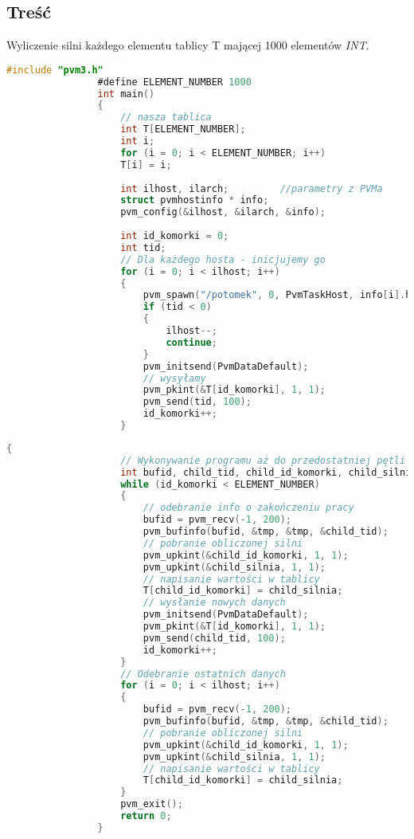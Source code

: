 			\subsection{Treść}
			Wyliczenie silni każdego elementu tablicy T mającej 1000 elementów \textit{INT}.
			\begin{lstlisting}[language=C]
				#include "pvm3.h"
				#define ELEMENT_NUMBER 1000
				int main()
				{
					// nasza tablica
					int T[ELEMENT_NUMBER];
					int i;
					for (i = 0; i < ELEMENT_NUMBER; i++)
					T[i] = i;
					
					int ilhost, ilarch;			//parametry z PVMa
					struct pvmhostinfo * info;
					pvm_config(&ilhost, &ilarch, &info);
					
					int id_komorki = 0;
					int tid;
					// Dla każdego hosta - inicjujemy go
					for (i = 0; i < ilhost; i++)
					{
						pvm_spawn("/potomek", 0, PvmTaskHost, info[i].hi_name, 1, &tid);	//powołanie potomka
						if (tid < 0)
						{
							ilhost--;
							continue;
						}
						pvm_initsend(PvmDataDefault);
						// wysyłamy
						pvm_pkint(&T[id_komorki], 1, 1);
						pvm_send(tid, 100);
						id_komorki++;
					}
			\end{lstlisting}
			\newpage
			\begin{lstlisting}[language=C]
				{
					// Wykonywanie programu aż do przedostatniej pętli
					int bufid, child_tid, child_id_komorki, child_silnia, tmp;
					while (id_komorki < ELEMENT_NUMBER)
					{
						// odebranie info o zakończeniu pracy
						bufid = pvm_recv(-1, 200);
						pvm_bufinfo(bufid, &tmp, &tmp, &child_tid);
						// pobranie obliczonej silni
						pvm_upkint(&child_id_komorki, 1, 1);
						pvm_upkint(&child_silnia, 1, 1);
						// napisanie wartości w tablicy
						T[child_id_komorki] = child_silnia;
						// wysłanie nowych danych
						pvm_initsend(PvmDataDefault);
						pvm_pkint(&T[id_komorki], 1, 1);
						pvm_send(child_tid, 100);
						id_komorki++;
					}
					// Odebranie ostatnich danych
					for (i = 0; i < ilhost; i++)
					{
						bufid = pvm_recv(-1, 200);
						pvm_bufinfo(bufid, &tmp, &tmp, &child_tid);
						// pobranie obliczonej silni
						pvm_upkint(&child_id_komorki, 1, 1);
						pvm_upkint(&child_silnia, 1, 1);
						// napisanie wartości w tablicy
						T[child_id_komorki] = child_silnia;
					}
					pvm_exit();
					return 0;
				}
			\end{lstlisting}
			\newpage
